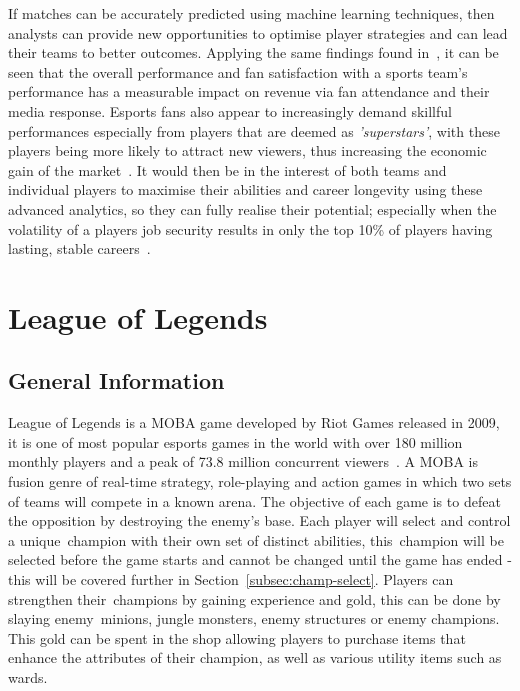 If matches can be accurately predicted using machine learning techniques, then analysts can provide new opportunities to optimise player strategies and can lead their teams to better outcomes.
Applying the same findings found in~\citet{gray2012customer}, it can be seen that the overall performance and fan satisfaction with a sports team's performance has a measurable impact on revenue via fan attendance and their media response.
Esports fans also appear to increasingly demand skillful performances especially from players that are deemed as \emph{'superstars'}, with these players being more likely to attract new viewers, thus increasing the economic gain of the market~\citep{mangeloja2019economics, ward2019esport}.
It would then be in the interest of both teams and individual players to maximise their abilities and career longevity using these advanced analytics, so they can fully realise their potential;
especially when the volatility of a players job security results in only the top 10\% of players having lasting, stable careers~\citep{ward2019esport}.\\


\section{League of Legends}\label{sec:League of Legends}
\subsection{General Information}\label{subsec:general-information}
League of Legends is a \ac{MOBA} game developed by Riot Games released in 2009, it is one of most popular esports games in the world with over 180 million monthly players and a peak of 73.8 million concurrent viewers~\citep{riotplayercount, upcomerworld2021}.
A \ac{MOBA} is fusion genre of real-time strategy, role-playing and action games in which two sets of teams will compete in a known arena.
The objective of each game is to defeat the opposition by destroying the enemy's base.
Each player will select and control a unique~\gls{champion} with their own set of distinct abilities, this~\gls{champion} will be selected before the game starts and cannot be changed until the game has ended - this will be covered further in Section~\ref{subsec:champ-select}.
Players can strengthen their~\glspl{champion} by gaining experience and gold, this can be done by slaying enemy~\glspl{minion}, \gls{jungle} monsters, enemy structures or enemy \glspl{champion}.
This gold can be spent in the shop allowing players to purchase items that enhance the attributes of their \gls{champion}, as well as various utility items such as \glspl{ward}.\\

